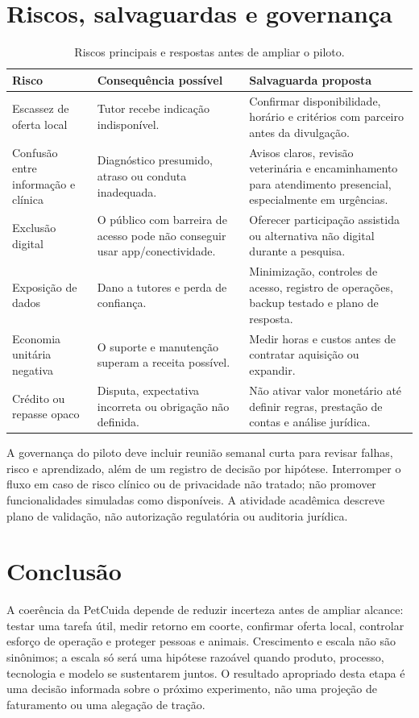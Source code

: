 \documentclass[12pt,a4paper]{article}
\begin{document}
\section{Riscos, salvaguardas e governança}
\begin{table}[ht]
\centering\small
\caption{Riscos principais e respostas antes de ampliar o piloto.}
\begin{tabularx}{\textwidth}{p{3.0cm}YY}
\toprule
\textbf{Risco} & \textbf{Consequência possível} & \textbf{Salvaguarda proposta}\\
\midrule
Escassez de oferta local & Tutor recebe indicação indisponível. & Confirmar disponibilidade, horário e critérios com parceiro antes da divulgação.\\
Confusão entre informação e clínica & Diagnóstico presumido, atraso ou conduta inadequada. & Avisos claros, revisão veterinária e encaminhamento para atendimento presencial, especialmente em urgências.\\
Exclusão digital & O público com barreira de acesso pode não conseguir usar app/conectividade. & Oferecer participação assistida ou alternativa não digital durante a pesquisa.\\
Exposição de dados & Dano a tutores e perda de confiança. & Minimização, controles de acesso, registro de operações, backup testado e plano de resposta.\\
Economia unitária negativa & O suporte e manutenção superam a receita possível. & Medir horas e custos antes de contratar aquisição ou expandir.\\
Crédito ou repasse opaco & Disputa, expectativa incorreta ou obrigação não definida. & Não ativar valor monetário até definir regras, prestação de contas e análise jurídica.\\
\bottomrule
\end{tabularx}
\end{table}

A governança do piloto deve incluir reunião semanal curta para revisar falhas, risco e aprendizado, além de um registro de decisão por hipótese. Interromper o fluxo em caso de risco clínico ou de privacidade não tratado; não promover funcionalidades simuladas como disponíveis. A atividade acadêmica descreve plano de validação, não autorização regulatória ou auditoria jurídica.

\section{Conclusão}
A coerência da PetCuida depende de reduzir incerteza antes de ampliar alcance: testar uma tarefa útil, medir retorno em coorte, confirmar oferta local, controlar esforço de operação e proteger pessoas e animais. Crescimento e escala não são sinônimos; a escala só será uma hipótese razoável quando produto, processo, tecnologia e modelo se sustentarem juntos. O resultado apropriado desta etapa é uma decisão informada sobre o próximo experimento, não uma projeção de faturamento ou uma alegação de tração.
\end{document}
